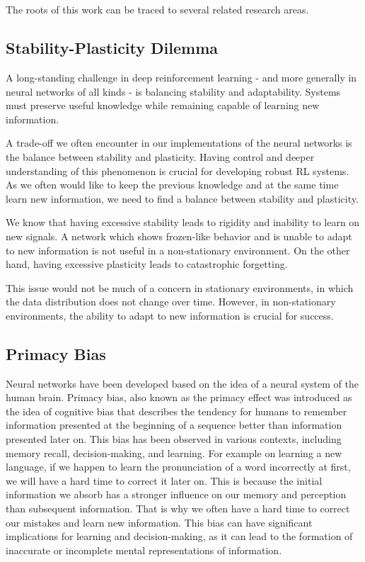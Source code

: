 \section{}\label{sec:fundamentals}
The roots of this work can be traced to several related research areas.


\subsection{Stability-Plasticity Dilemma}

A long-standing challenge in deep reinforcement learning - and more generally in neural networks of all kinds - is balancing stability and adaptability. Systems must preserve useful knowledge while remaining capable of learning new information.

A trade-off we often encounter in our implementations of the neural networks is the balance between stability and plasticity. Having control and deeper understanding of this phenomenon is crucial for developing robust RL systems. As we often would like to keep the previous knowledge and at the same time learn new information, we need to find a balance between stability and plasticity.

We know that having excessive stability leads to rigidity and inability to learn on new signals. A network which shows frozen-like behavior and is unable to adapt to new information is not useful in a non-stationary environment. On the other hand, having excessive plasticity leads to catastrophic forgetting.

This issue would not be much of a concern in stationary environments, in which the data distribution does not change over time. However, in non-stationary environments, the ability to adapt to new information is crucial for success.


\subsection{Primacy Bias}

Neural networks have been developed based on the idea of a neural system of the human brain. Primacy bias, also known as the primacy effect was introduced as the idea of cognitive bias that describes the tendency for humans to remember information presented at the beginning of a sequence better than information presented later on. This bias has been observed in various contexts, including memory recall, decision-making, and learning.
For example on learning a new language, if we happen to learn the pronunciation of a word incorrectly at first, we will have a hard time to correct it later on. This is because the initial information we absorb has a stronger influence on our memory and perception than subsequent information. That is why we often have a hard time to correct our mistakes and learn new information. This bias can have significant implications for learning and decision-making, as it can lead to the formation of inaccurate or incomplete mental representations of information.

